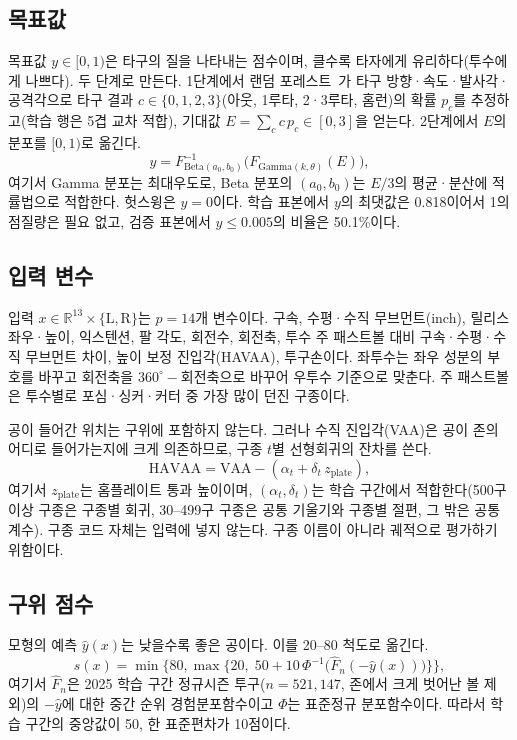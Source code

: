 \documentclass[journal,a4paper,10pt]{IEEEtran}
\begin{document}
\subsection{목표값}
목표값 $y\in[0,1)$은 타구의 질을 나타내는 점수이며, 클수록 타자에게 유리하다(투수에게 나쁘다). 두 단계로 만든다. 1단계에서 랜덤 포레스트~\cite{breiman2001random}가 타구 방향·속도·발사각·공격각으로 타구 결과 $c\in\{0,1,2,3\}$(아웃, 1루타, 2·3루타, 홈런)의 확률 $p_c$를 추정하고(학습 행은 5겹 교차 적합), 기대값 $E=\sum_c c\,p_c\in[0,3]$을 얻는다. 2단계에서 $E$의 분포를 $[0,1)$로 옮긴다.
\begin{equation}
y = F^{-1}_{\mathrm{Beta}(a_0,b_0)}\!\big(F_{\mathrm{Gamma}(k,\theta)}(E)\big),
\label{eq:target}
\end{equation}
여기서 Gamma 분포는 최대우도로, Beta 분포의 $(a_0,b_0)$는 $E/3$의 평균·분산에 적률법으로 적합한다. 헛스윙은 $y=0$이다. 학습 표본에서 $y$의 최댓값은 0.818이어서 1의 점질량은 필요 없고, 검증 표본에서 $y\le0.005$의 비율은 50.1\%이다.

\subsection{입력 변수}
입력 $x\in\mathbb{R}^{13}\times\{\mathrm{L},\mathrm{R}\}$는 $p=14$개 변수이다. 구속, 수평·수직 무브먼트(inch), 릴리스 좌우·높이, 익스텐션, 팔 각도, 회전수, 회전축, 투수 주 패스트볼 대비 구속·수평·수직 무브먼트 차이, 높이 보정 진입각(HAVAA), 투구손이다. 좌투수는 좌우 성분의 부호를 바꾸고 회전축을 $360^\circ-$회전축으로 바꾸어 우투수 기준으로 맞춘다. 주 패스트볼은 투수별로 포심·싱커·커터 중 가장 많이 던진 구종이다.

공이 들어간 위치는 구위에 포함하지 않는다. 그러나 수직 진입각(VAA)은 공이 존의 어디로 들어가는지에 크게 의존하므로, 구종 $t$별 선형회귀의 잔차를 쓴다.
\begin{equation}
\mathrm{HAVAA} = \mathrm{VAA} - (\alpha_t + \delta_t\, z_{\mathrm{plate}}),
\label{eq:havaa}
\end{equation}
여기서 $z_{\mathrm{plate}}$는 홈플레이트 통과 높이이며, $(\alpha_t,\delta_t)$는 학습 구간에서 적합한다(500구 이상 구종은 구종별 회귀, 30–499구 구종은 공통 기울기와 구종별 절편, 그 밖은 공통 계수). 구종 코드 자체는 입력에 넣지 않는다. 구종 이름이 아니라 궤적으로 평가하기 위함이다.

\subsection{구위 점수}
모형의 예측 $\hat y(x)$는 낮을수록 좋은 공이다. 이를 20–80 척도로 옮긴다.
\begin{equation}
s(x)=\min\!\Big\{80,\max\!\big\{20,\;50+10\,\Phi^{-1}\!\big(\hat F_n(-\hat y(x))\big)\big\}\Big\},
\label{eq:scale}
\end{equation}
여기서 $\hat F_n$은 2025 학습 구간 정규시즌 투구($n=521{,}147$, 존에서 크게 벗어난 볼 제외)의 $-\hat y$에 대한 중간 순위 경험분포함수이고 $\Phi$는 표준정규 분포함수이다. 따라서 학습 구간의 중앙값이 50, 한 표준편차가 10점이다.
\end{document}
